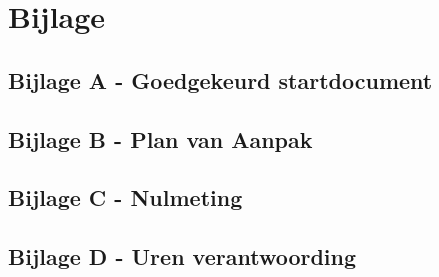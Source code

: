 \section{Bijlage}

\subsection{Bijlage A - Goedgekeurd startdocument}



\subsection{Bijlage B - Plan van Aanpak}



\subsection{Bijlage C - Nulmeting}



\subsection{Bijlage D - Uren verantwoording}

